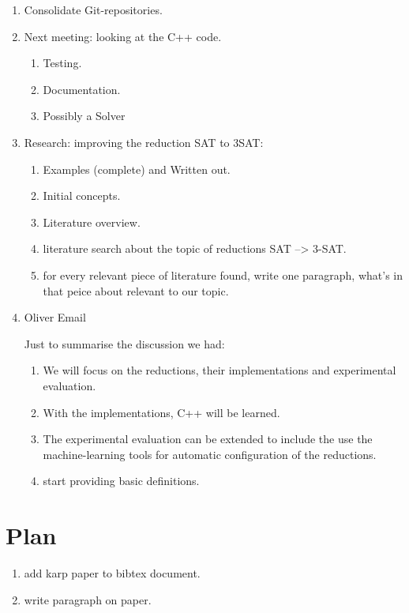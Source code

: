 \documentclass[a4paper]{report}
\begin{document}
\begin{enumerate}
\item Consolidate Git-repositories.
\item Next meeting: looking at the C++ code.
  \begin{enumerate}
  \item Testing.
  \item Documentation.
  \item Possibly a Solver
  \end{enumerate}
\item Research: improving the reduction SAT to 3SAT:
  \begin{enumerate}
  \item Examples (complete) and Written out.
  \item Initial concepts.
  \item Literature overview.
  \item literature search about the topic of reductions SAT --> 3-SAT.
  \item for every relevant piece of literature found, write one paragraph, what's in that peice about relevant to our topic.
  \end{enumerate}
\item Oliver Email

  Just to summarise the discussion we had:
  \begin{enumerate}
     \item We will focus on the reductions, their implementations and experimental evaluation.
    \item With the implementations, C++ will be learned.
    \item The experimental evaluation can be extended to include the use the machine-learning tools for automatic configuration of the reductions.
    \item start providing basic definitions.
  \end{enumerate}
\end{enumerate}

\section{Plan}
\label{sec:Plan}
\begin{enumerate}
\item add karp paper to bibtex document.\cite{Karp1972NP}
\item write paragraph on paper.

\end{enumerate}
\end{document}
